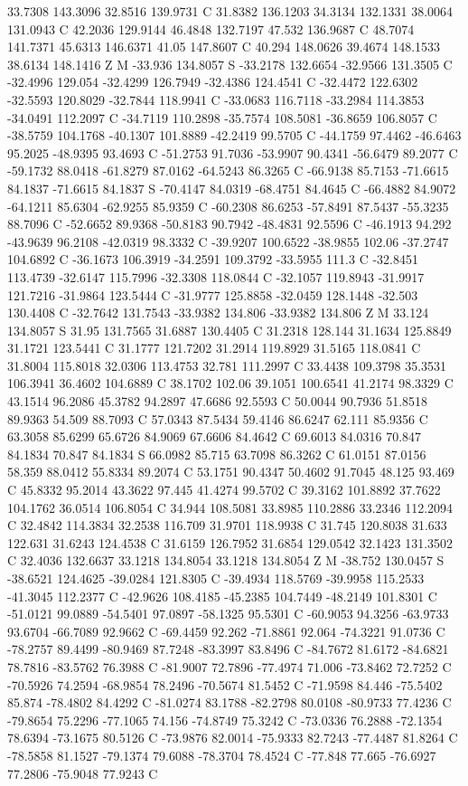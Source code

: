 {{{33.7308 143.3096 32.8516 139.9731 C 31.8382 136.1203 34.3134 132.1331 38.0064 131.0943 C 42.2036 129.9144 46.4848 132.7197 47.532 136.9687 C 48.7074 141.7371 45.6313 146.6371 41.05 147.8607 C 40.294 148.0626 39.4674 148.1533 38.6134 148.1416 Z M -33.936 134.8057 S -33.2178 132.6654 -32.9566 131.3505 C -32.4996 129.054 -32.4299 126.7949 -32.4386 124.4541 C -32.4472 122.6302 -32.5593 120.8029 -32.7844 118.9941 C -33.0683 116.7118 -33.2984 114.3853 -34.0491 112.2097 C -34.7119 110.2898 -35.7574 108.5081 -36.8659 106.8057 C -38.5759 104.1768 -40.1307 101.8889 -42.2419 99.5705 C -44.1759 97.4462 -46.6463 95.2025 -48.9395 93.4693 C -51.2753 91.7036 -53.9907 90.4341 -56.6479 89.2077 C -59.1732 88.0418 -61.8279 87.0162 -64.5243 86.3265 C -66.9138 85.7153 -71.6615 84.1837 -71.6615 84.1837 S -70.4147 84.0319 -68.4751 84.4645 C -66.4882 84.9072 -64.1211 85.6304 -62.9255 85.9359 C -60.2308 86.6253 -57.8491 87.5437 -55.3235 88.7096 C -52.6652 89.9368 -50.8183 90.7942 -48.4831 92.5596 C -46.1913 94.292 -43.9639 96.2108 -42.0319 98.3332 C -39.9207 100.6522 -38.9855 102.06 -37.2747 104.6892 C -36.1673 106.3919 -34.2591 109.3792 -33.5955 111.3 C -32.8451 113.4739 -32.6147 115.7996 -32.3308 118.0844 C -32.1057 119.8943 -31.9917 121.7216 -31.9864 123.5444 C -31.9777 125.8858 -32.0459 128.1448 -32.503 130.4408 C -32.7642 131.7543 -33.9382 134.806 -33.9382 134.806 Z M 33.124 134.8057 S 31.95 131.7565 31.6887 130.4405 C 31.2318 128.144 31.1634 125.8849 31.1721 123.5441 C 31.1777 121.7202 31.2914 119.8929 31.5165 118.0841 C 31.8004 115.8018 32.0306 113.4753 32.781 111.2997 C 33.4438 109.3798 35.3531 106.3941 36.4602 104.6889 C 38.1702 102.06 39.1051 100.6541 41.2174 98.3329 C 43.1514 96.2086 45.3782 94.2897 47.6686 92.5593 C 50.0044 90.7936 51.8518 89.9363 54.509 88.7093 C 57.0343 87.5434 59.4146 86.6247 62.111 85.9356 C 63.3058 85.6299 65.6726 84.9069 67.6606 84.4642 C 69.6013 84.0316 70.847 84.1834 70.847 84.1834 S 66.0982 85.715 63.7098 86.3262 C 61.0151 87.0156 58.359 88.0412 55.8334 89.2074 C 53.1751 90.4347 50.4602 91.7045 48.125 93.469 C 45.8332 95.2014 43.3622 97.445 41.4274 99.5702 C 39.3162 101.8892 37.7622 104.1762 36.0514 106.8054 C 34.944 108.5081 33.8985 110.2886 33.2346 112.2094 C 32.4842 114.3834 32.2538 116.709 31.9701 118.9938 C 31.745 120.8038 31.633 122.631 31.6243 124.4538 C 31.6159 126.7952 31.6854 129.0542 32.1423 131.3502 C 32.4036 132.6637 33.1218 134.8054 33.1218 134.8054 Z M -38.752 130.0457 S -38.6521 124.4625 -39.0284 121.8305 C -39.4934 118.5769 -39.9958 115.2533 -41.3045 112.2377 C -42.9626 108.4185 -45.2385 104.7449 -48.2149 101.8301 C -51.0121 99.0889 -54.5401 97.0897 -58.1325 95.5301 C -60.9053 94.3256 -63.9733 93.6704 -66.7089 92.9662 C -69.4459 92.262 -71.8861 92.064 -74.3221 91.0736 C -78.2757 89.4499 -80.9469 87.7248 -83.3997 83.8496 C -84.7672 81.6172 -84.6821 78.7816 -83.5762 76.3988 C -81.9007 72.7896 -77.4974 71.006 -73.8462 72.7252 C -70.5926 74.2594 -68.9854 78.2496 -70.5674 81.5452 C -71.9598 84.446 -75.5402 85.874 -78.4802 84.4292 C -81.0274 83.1788 -82.2798 80.0108 -80.9733 77.4236 C -79.8654 75.2296 -77.1065 74.156 -74.8749 75.3242 C -73.0336 76.2888 -72.1354 78.6394 -73.1675 80.5126 C -73.9876 82.0014 -75.9333 82.7243 -77.4487 81.8264 C -78.5858 81.1527 -79.1374 79.6088 -78.3704 78.4524 C -77.848 77.665 -76.6927 77.2806 -75.9048 77.9243 C }}}
